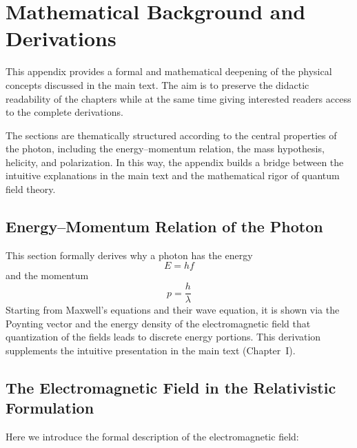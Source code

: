 \cleardoublepage
\appendix
\renewcommand{\thechapter}{A}
\renewcommand{\thesection}{\Alph{chapter}.\arabic{section}}


\chapter{Mathematical Background and Derivations}
\label{anhangA}

This appendix provides a formal and mathematical deepening of the physical
concepts discussed in the main text. The aim is to preserve the didactic
readability of the chapters while at the same time giving interested readers
access to the complete derivations.  

The sections are thematically structured according to the central properties
of the photon, including the energy–momentum relation, the mass hypothesis,
helicity, and polarization. In this way, the appendix builds a bridge between
the intuitive explanations in the main text and the mathematical rigor of
quantum field theory.

\section{Energy–Momentum Relation of the Photon}
\label{anhangA:energie_impuls}

This section formally derives why a photon has the energy
\[
E = h f
\]
and the momentum
\[
p = \frac{h}{\lambda}
\]
Starting from Maxwell’s equations and their wave equation, it is shown via the
Poynting vector and the energy density of the electromagnetic field that
quantization of the fields leads to discrete energy portions. This derivation
supplements the intuitive presentation in the main text (Chapter~I).

\section{The Electromagnetic Field in the Relativistic Formulation}
\label{anhangA:feldtheorie}

Here we introduce the formal description of the electromagnetic field:

